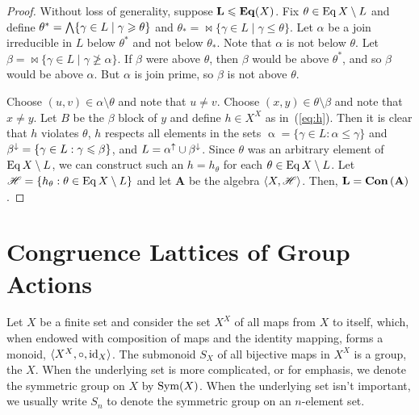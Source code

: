 \begin{proof}
  Without loss of generality, suppose $\mathbf{L}\leqslant \mathbf{Eq}(X)$. 
  Fix $\theta\in \operatorname{Eq} X \setminus L$ and define 
  $\theta^* = \bigwedge \{ \gamma \in L \mid \gamma \geqslant \theta \}$ and 
  $\theta_* = \Join \{ \gamma \in L \mid \gamma \leq \theta \}$.
  Let $\alpha$ be a join irreducible in $L$ below $\theta^*$ and not below
  $\theta_*$. 
  Note that $\alpha$ is not below $\theta$.
  Let $\beta = \Join \{ \gamma \in L \mid \gamma \ngeq \alpha \}$.
  If $\beta$ were above $\theta$, then $\beta$ would be above $\theta^*$,
  and so $\beta$ would be above $\alpha$. But $\alpha$ is join prime, so $\beta$ is not
  above $\theta$. 

  Choose $(u, v) \in \alpha \setminus \theta$ and note that $u \neq v$.
  Choose $(x, y) \in \theta \setminus \beta$ and note that $x \neq y$.
  Let $B$ be the $\beta$ block of $y$ and define $h\in X^X$ as in~(\ref{eq:h}). Then it
  is clear that $h$ violates $\theta$, $h$ respects all elements in the sets
  $\upalpha = \{\gamma \in L: \alpha \leq \gamma\}$ and 
  $\beta^{\downarrow} = \{\gamma \in L: \gamma \leqslant \beta\}$, and $L = \alpha^{\uparrow} \cup
  \beta^{\downarrow}$. Since $\theta$ was an arbitrary element of $\operatorname{Eq} X \setminus L$, we can
  construct such an $h = h_\theta$ for each $\theta \in \operatorname{Eq} X \setminus L$.  Let $\mathscr{H} = \{h_\theta:
  \theta \in \operatorname{Eq} X \setminus L\}$ and let $\mathbf{A}$ be the algebra 
  $\langle X, \mathscr{H}\rangle$.  Then, $\mathbf{L} =\mathbf{Con\,}(\mathbf{A})$. %
\end{proof}



\section{Congruence Lattices of Group Actions}
\label{sec:congr-latt-group}


Let $X$ be a finite set and consider the set $X^X$ of all maps from $X$ to
itself, which, when endowed with composition of maps and the identity mapping,
forms a monoid, $\langle X^X, \circ, \operatorname{id}_X\rangle$.  The submonoid $S_X$ of all bijective
maps in $X^X$ is a group, the  $X$.  When the
underlying set is more complicated, or for emphasis, we denote the symmetric
group on $X$ by $\operatorname{Sym}(X)$.  When the  
underlying set isn't important, we usually write $S_n$ to denote the
symmetric group on an $n$-element set. 

